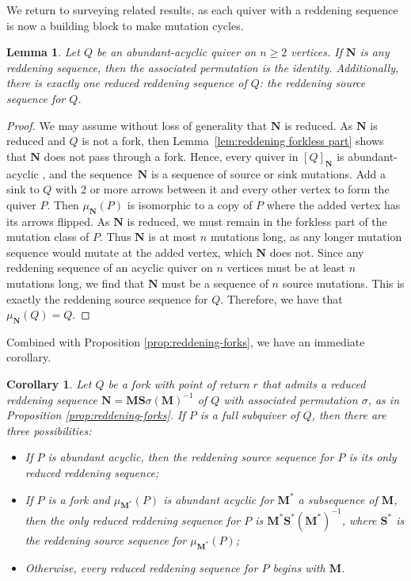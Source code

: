 \documentclass[11pt, letterpaper]{amsart}
\newtheorem{corollary}[theorem]{Corollary}
\newtheorem{lemma}[theorem]{Lemma}
\theoremstyle{definition}
\numberwithin{equation}{section}
\begin{document}
We return to surveying related results, as each quiver with a reddening sequence is now a building block to make mutation cycles.

\begin{lemma} \label{lem:abundant acyclic equality}
    Let $Q$ be an abundant-acyclic quiver on $n \geq 2$ vertices.
    If $\mathbf{N}$ is any reddening sequence, then the associated permutation is the identity.
    Additionally, there is exactly one reduced reddening sequence of $Q$: the reddening source sequence for $Q$. 
\end{lemma}

\begin{proof}
We may assume without loss of generality that $\mathbf{N}$ is reduced.
As $\mathbf{N}$ is reduced and $Q$ is not a fork, then Lemma~\ref{lem:reddening forkless part} shows that $\mathbf{N}$ does not pass through a fork.
Hence, every quiver in $[Q]_\mathbf{N}$ is abundant-acyclic \cite[Lemma 2.15]{MR4695532}, and the sequence~$\mathbf{N}$ 
is a sequence of source or sink mutations.
Add a sink to $Q$ with 2 or more arrows between it and every other vertex to form the quiver $P$.
Then $\mu_{\mathbf{N}}(P)$ is isomorphic to a copy of $P$ where the added vertex has its arrows flipped.
As $\mathbf{N}$ is reduced, we must remain in the forkless part of the mutation class of $P$.
Thus $\mathbf{N}$ is at most $n$ mutations long, as any longer mutation sequence would mutate at the added vertex, which $\mathbf{N}$ does not.
Since any reddening sequence of an acyclic quiver on $n$ vertices must be at least $n$ mutations long, we find that $\mathbf{N}$ must be a sequence of $n$ source mutations.
This is exactly the reddening source sequence for $Q$.
Therefore, we have that $\mu_{\mathbf{N}}(Q) = Q$.
\end{proof}

Combined with Proposition \ref{prop:reddening-forks}, we have an immediate corollary.

\begin{corollary} \label{cor:reddening-forks}
    Let $Q$ be a fork with point of return $r$ that admits a reduced reddening sequence $\mathbf{N} = \mathbf{MS}\sigma(\mathbf{M})^{-1}$ of $Q$ with associated permutation $\sigma$, as in Proposition \ref{prop:reddening-forks}.
    If $P$ is a full subquiver of $Q$, then there are three possibilities:
    \begin{itemize}
        \item If $P$ is abundant acyclic, then the reddening source sequence for $P$ is its only reduced reddening sequence;

        \item If $P$ is a fork and $\mu_{\mathbf{M^*}}(P)$ is abundant acyclic for $\mathbf M^*$ a subsequence of $\mathbf{M}$, then the only reduced reddening sequence for $P$ is $\mathbf{M^* S^*} (\mathbf{ M^*})^{-1}$, where $\mathbf{S^*}$ is the reddening source sequence for $\mu_{\mathbf{M^*}}(P)$;

        \item Otherwise, every reduced reddening sequence for $P$ begins with $\mathbf{M}$.
    \end{itemize}
\end{corollary}
\end{document}
